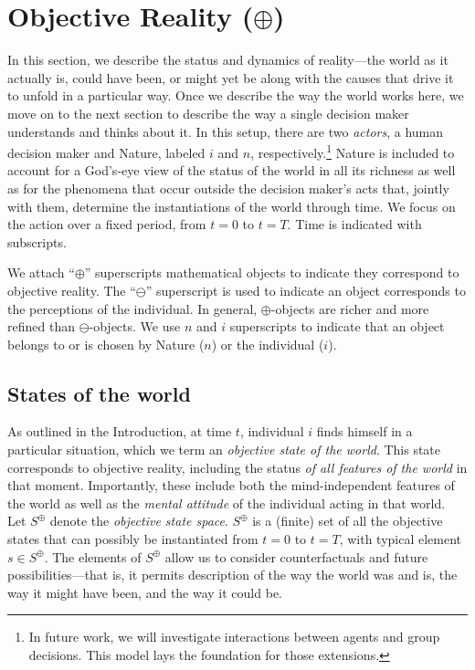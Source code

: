 \documentclass[
11pt,
titlepage,
reqno,
]{article}%
\theoremstyle{definition}
\begin{document}
	
\section{Objective Reality ($\oplus$)}\label{sec:world}
	
In this section, we describe the status and dynamics of reality---the world as it actually is, could have been, or might yet be along with the causes that drive it to unfold in a particular way. 
Once we describe the way the world works here, we move on to the next section to describe the way a single decision maker understands and thinks about it.
In this setup, there are two \textit{actors}, a human decision maker and Nature, labeled $i$ and $n$, respectively.\footnote
{
	In future work, we will investigate interactions between agents and group decisions.
		This model lays the foundation for those extensions.
} 
Nature is included to account for  a God's-eye view of the status of the world in all its richness as well as for the phenomena that occur outside the decision maker's acts that, jointly with them, determine the instantiations of the world through time.
We focus on the action over a fixed period, from $t=0$ to $t=T$. 
Time is indicated with subscripts.
	
We attach ``$\oplus$'' superscripts mathematical objects to indicate they correspond to objective reality.
The ``$\ominus$'' superscript is used to indicate an object corresponds to the perceptions of the individual.
In general, $\oplus$-objects are richer and more refined than $\ominus$-objects. 
We use $n$ and $i$ superscripts to indicate that an object belongs to or is chosen by Nature ($n$) or the individual ($i$).
	
	
	
	
\subsection{States of the world\label{sec:states}}
	
As outlined in the Introduction, at time $t$, individual $i$ finds himself in a particular situation, which we term an \textit{objective state of the world}.
This state corresponds to objective reality, including the status \textit{of all features of the world} in that moment. 
Importantly, these include both the  mind-independent features of the world as well as the \textit{mental attitude} of the individual acting in that world. 
Let $S^\oplus$ denote the \textit{objective state space}.
$S^\oplus$ is a (finite) set of all the objective states  that can possibly be instantiated from $t=0$ to $t=T$, with typical element $s\in S^\oplus$.
The elements of $S^\oplus$ allow us to consider counterfactuals and future possibilities---that is, it permits description of the way the world was and is, the way it might have been, and the way it could be.
\end{document}
